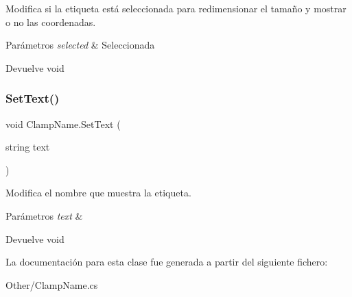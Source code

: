 Modifica si la etiqueta está seleccionada para redimensionar el tamaño y mostrar o no las coordenadas. 
\begin{DoxyParams}{Parámetros}
{\em selected} & Seleccionada \\
\hline
\end{DoxyParams}
\begin{DoxyReturn}{Devuelve}
void 
\end{DoxyReturn}
\mbox{\label{class_clamp_name_a8845016c54fa64235db1c72716098f96}} 
\subsubsection{\texorpdfstring{SetText()}{SetText()}}
{\footnotesize\ttfamily void Clamp\+Name.\+Set\+Text (\begin{DoxyParamCaption}\item[{string}]{text }\end{DoxyParamCaption})\hspace{0.3cm}{\ttfamily [inline]}}

Modifica el nombre que muestra la etiqueta. 
\begin{DoxyParams}{Parámetros}
{\em text} & \\
\hline
\end{DoxyParams}
\begin{DoxyReturn}{Devuelve}
void 
\end{DoxyReturn}


La documentación para esta clase fue generada a partir del siguiente fichero\+:\begin{DoxyCompactItemize}
\item 
Other/Clamp\+Name.\+cs\end{DoxyCompactItemize}
